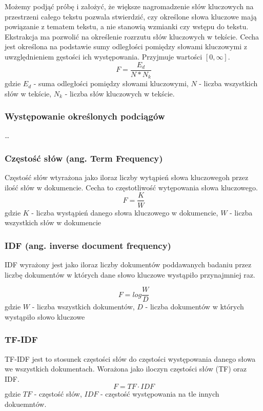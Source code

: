 \documentclass{classrep}
\begin{document}
Możemy podjąć próbę i założyć, że większe nagromadzenie słów kluczowych na przestrzeni całego tekstu pozwala
stwierdzić, czy określone słowa kluczowe mają powiązanie z tematem tekstu, a nie stanowią wzmianki czy wstępu do
tekstu. Ekstrakcja ma pozwolić na określenie rozrzutu słów kluczowych w tekście. Cecha jest określona na podstawie
sumy odległości pomiędzy słowami kluczowymi z uwzględnieniem gęstości ich występowania. Przyjmuje wartości $[0, \infty]$.
\begin{equation}
    F=\frac{E_{d}}{N*N_{k}}
\end{equation}
gdzie $E_{d}$ - suma odległości pomiędzy słowami kluczowymi, $N$ - liczba wszystkich słów w tekście,
$N_{k}$ - liczba słów kluczowych w tekście.



\subsubsection{Występowanie określonych podciągów}
\dots

\subsubsection{Częstość słów (ang. Term Frequency)}
Częstość słów wtyrażona jako iloraz liczby wytąpień słowa kluczowegoh przez ilość słów w dokumencie. Cecha to
częstotliwość wytępowania słowa kluczowego.
\begin{equation}
    F=\frac{K}{W}
\end{equation}
gdzie $K$ - liczba wystąpień danego słowa kluczowego w dokumencie, $W$ - liczba wszystkich słów w dokumencie

\subsubsection{IDF (ang. inverse document frequency)}
IDF wyrażony jest jako iloraz liczby dokumentów poddawanych badaniu przez liczbę dokumentów w których dane słowo
kluczowe wystąpiło przynajmniej raz.

\begin{equation}
    F=log \frac{W}{D}
\end{equation}
gdzie $W$ - liczba wszystkich dokumentów, $D$ - liczba dokumentów w których wystąpiło słowo kluczowe

\subsubsection{TF-IDF}
TF-IDF jest to stosunek częstości słów do częstości występowania danego słowa we wszystkich dokumentach.
Worażona jako iloczyn częstości słów (TF) oraz IDF.
\begin{equation}
    F={TF}\cdot{IDF}
\end{equation}
gdzie $TF$ - częstość słów, $IDF$ - częstość występowania na tle innych dokuemntów.
\end{document}
